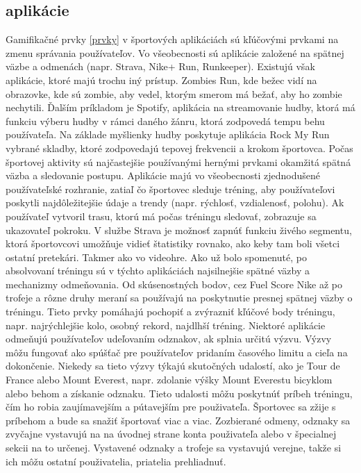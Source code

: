 \documentclass[10pt,twoside,slovak,a4paper]{article}
\begin{document}
\subsection{aplikácie} \label{aplikácie}

Gamifikačné prvky \ref{prvky} v športových aplikáciách sú kľúčovými prvkami na zmenu správania používateľov. Vo všeobecnosti sú aplikácie založené na spätnej väzbe a odmenách (napr. Strava, Nike+ Run, Runkeeper). Existujú však aplikácie, ktoré majú trochu iný prístup. Zombies Run, kde bežec vidí na obrazovke, kde sú zombie, aby vedel, ktorým smerom má bežať, aby ho zombie nechytili. Ďalším príkladom je Spotify, aplikácia na streamovanie hudby, ktorá má funkciu výberu hudby v rámci daného žánru, ktorá zodpovedá tempu behu používateľa. Na základe myšlienky hudby poskytuje aplikácia Rock My Run vybrané skladby, ktoré zodpovedajú tepovej frekvencii a krokom športovca. Počas športovej aktivity sú najčastejšie používanými hernými prvkami okamžitá spätná väzba a sledovanie postupu. Aplikácie majú vo všeobecnosti zjednodušené používateľské rozhranie, zatiaľ čo športovec sleduje tréning, aby používateľovi poskytli najdôležitejšie údaje a trendy (napr. rýchlosť, vzdialenosť, polohu). Ak používateľ vytvoril trasu, ktorú má počas tréningu sledovať, zobrazuje sa ukazovateľ pokroku. V službe Strava je možnosť zapnúť funkciu živého segmentu, ktorá športovcovi umožňuje vidieť štatistiky rovnako, ako keby tam boli všetci ostatní pretekári. Takmer ako vo videohre.
Ako už bolo spomenuté, po absolvovaní tréningu sú v týchto aplikáciách najsilnejšie spätné väzby a mechanizmy odmeňovania. Od skúsenostných bodov, cez Fuel Score Nike až po trofeje a rôzne druhy meraní sa používajú na poskytnutie presnej spätnej väzby o tréningu. Tieto prvky pomáhajú pochopiť a zvýrazniť kľúčové body tréningu, napr. najrýchlejšie kolo, osobný rekord, najdlhší tréning.
Niektoré aplikácie odmeňujú používateľov udeľovaním odznakov, ak splnia určitú výzvu. Výzvy môžu fungovať ako spúšťač pre používateľov pridaním časového limitu a cieľa na dokončenie. Niekedy sa tieto výzvy týkajú skutočných udalostí, ako je Tour de France alebo Mount Everest, napr. zdolanie výšky Mount Everestu bicyklom alebo behom a získanie odznaku. Tieto udalosti môžu poskytnúť príbeh tréningu, čím ho robia zaujímavejším a pútavejším pre použivateľa. Športovec sa zžije s príbehom a bude sa snažiť športovať viac a viac. Zozbierané odmeny, odznaky sa zvyčajne vystavujú na na úvodnej strane konta použivateľa alebo v špecialnej sekcii na to určenej. Vystavené odznaky a trofeje sa vystavujú verejne, takže si ich môžu ostatní použivatelia, priatelia prehliadnuť.\cite{Effect_of_gamification-Framework}
\end{document}
